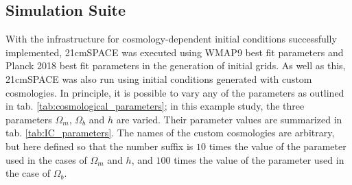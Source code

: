 \documentclass[floats,floatfix,showpacs,amssymb,prd,superscriptaddress,nofootinbib]{revtex4-2} %
\begin{document}
\subsection{Simulation Suite}
With the infrastructure for cosmology-dependent initial conditions successfully implemented, 21cmSPACE was executed using WMAP9 best fit parameters \citep{WMAP9results} and Planck 2018 best fit parameters \citep{Planck2018results} in the generation of initial grids. As well as this, 21cmSPACE was also run using initial conditions generated with custom cosmologies. In principle, it is possible to vary any of the parameters as outlined in tab. \ref{tab:cosmological_parameters}; in this example study, the three parameters $\Omega_m$, $\Omega_b$ and $h$ are varied. Their parameter values are summarized in tab. \ref{tab:IC_parameters}. The names of the custom cosmologies are arbitrary, but here defined so that the number suffix is $10$ times the value of the parameter used in the cases of $\Omega_m$ and $h$, and $100$ times the value of the parameter used in the case of $\Omega_b$. 
\end{document}
